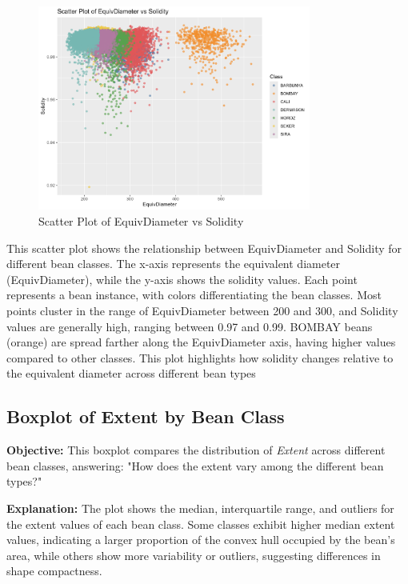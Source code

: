 \documentclass[a4paper,12pt]{article}
\begin{document}
\begin{figure}[H]
    \centering
    \includegraphics[width=0.8\textwidth]{graphs/scatter_equiv_solidity.png}
    \caption{Scatter Plot of EquivDiameter vs Solidity}
    \label{fig:scatter_equiv_solidity}
\end{figure}
This scatter plot shows the relationship between EquivDiameter and Solidity for different bean classes. The x-axis represents the equivalent diameter (EquivDiameter), while the y-axis shows the solidity values. Each point represents a bean instance, with colors differentiating the bean classes. Most points cluster in the range of EquivDiameter between 200 and 300, and Solidity values are generally high, ranging between 0.97 and 0.99. BOMBAY beans (orange) are spread farther along the EquivDiameter axis, having higher values compared to other classes. This plot highlights how solidity changes relative to the equivalent diameter across different bean types

\newpage

\subsection{Boxplot of Extent by Bean Class}
\noindent\textbf{Objective:} This boxplot compares the distribution of \textit{Extent} across different bean classes, answering: "How does the extent vary among the different bean types?"

\noindent\textbf{Explanation:} The plot shows the median, interquartile range, and outliers for the extent values of each bean class. Some classes exhibit higher median extent values, indicating a larger proportion of the convex hull occupied by the bean's area, while others show more variability or outliers, suggesting differences in shape compactness.
\end{document}
